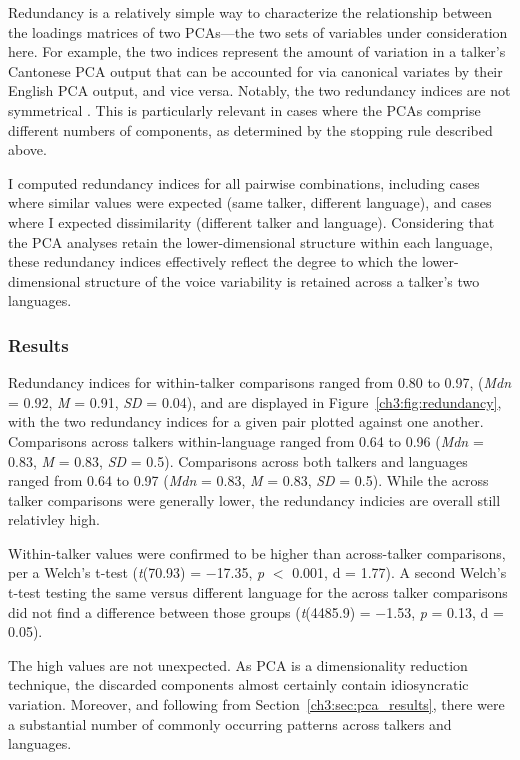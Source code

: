 Redundancy is a relatively simple way to characterize the relationship between the loadings matrices of two PCAs---the two sets of variables under consideration here. For example, the two indices represent the amount of variation in a talker's Cantonese PCA output that can be accounted for via canonical variates by their English PCA output, and vice versa. Notably, the two redundancy indices are not symmetrical \citep{stewart_1968_canonical}. This is particularly relevant in cases where the PCAs comprise different numbers of components, as determined by the stopping rule described above.

I computed redundancy indices for all pairwise combinations, including cases where similar values were expected (same talker, different language), and cases where I expected dissimilarity (different talker and language). Considering that the PCA analyses retain the lower-dimensional structure within each language, these redundancy indices effectively reflect the degree to which the lower-dimensional structure of the voice variability is retained across a talker's two languages.

\subsubsection{Results}

Redundancy indices for within-talker comparisons ranged from 0.80 to 0.97, (\textit{Mdn} = 0.92, \textit{M} = 0.91, \textit{SD} = 0.04), and are displayed in Figure~\ref{ch3:fig:redundancy}, with the two redundancy indices for a given pair plotted against one another. Comparisons across talkers within-language ranged from 0.64 to 0.96 (\textit{Mdn} = 0.83, \textit{M} = 0.83, \textit{SD} = 0.5). Comparisons across both talkers and languages ranged from 0.64 to 0.97 (\textit{Mdn} = 0.83, \textit{M} = 0.83, \textit{SD} = 0.5). While the across talker comparisons were generally lower, the redundancy indicies are overall still relativley high. 

Within-talker values were confirmed to be higher than across-talker comparisons, per a Welch's t-test (\textit{t}(70.93) = $-$17.35, \textit{p} $<$ 0.001, d = 1.77). A second Welch's t-test testing the same versus different language for the across talker comparisons did not find a difference between those groups (\textit{t}(4485.9) = $-$1.53, \textit{p} = 0.13, d = 0.05). 

The high values are not unexpected. As PCA is a dimensionality reduction technique, the discarded components almost certainly contain idiosyncratic variation. Moreover, and following from Section~\ref{ch3:sec:pca_results}, there were a substantial number of commonly occurring patterns across talkers and languages. 

